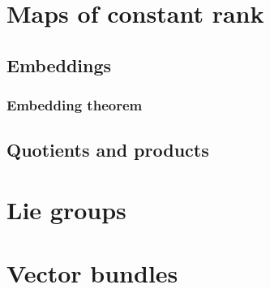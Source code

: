 \documentclass[11pt,a4paper]{book}
\theoremstyle{remark} \newtheorem{rmk}[thm]{Remark}
\theoremstyle{definition} \newtheorem{defn}[thm]{Definition}
\theoremstyle{definition} \newtheorem{ex}[thm]{Example}
\theoremstyle{definition} \newtheorem{ej}[thm]{Exercise}
\begin{document}
\section{Maps of constant rank}

\subsection{Embeddings}

\subsubsection{Embedding theorem}

\subsection{Quotients and products}

\section{Lie groups}
\todo{}

\section{Vector bundles}
\end{document}
